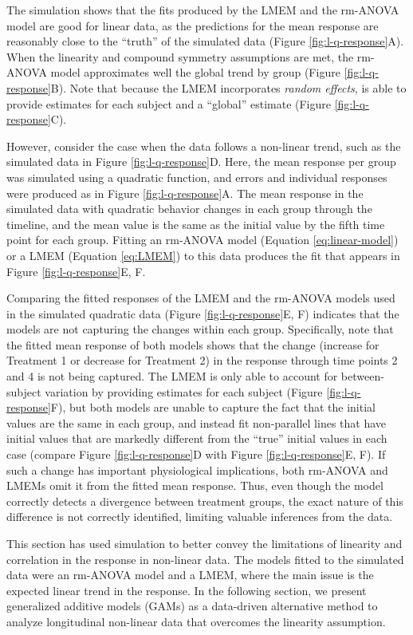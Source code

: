 \documentclass[
]{article}
\begin{document}
The simulation shows that the fits produced by the LMEM and the rm-ANOVA model are good for linear data, as the predictions for the mean response are reasonably close to the ``truth'' of the simulated data (Figure \ref{fig:l-q-response}A). When the linearity and compound symmetry assumptions are met, the rm-ANOVA model approximates well the global trend by group (Figure \ref{fig:l-q-response}B). Note that because the LMEM incorporates \emph{random effects}, is able to provide estimates for each subject and a ``global'' estimate (Figure \ref{fig:l-q-response}C).

However, consider the case when the data follows a non-linear trend, such as the simulated data in Figure \ref{fig:l-q-response}D. Here, the mean response per group was simulated using a quadratic function, and errors and individual responses were produced as in Figure \ref{fig:l-q-response}A. The mean response in the simulated data with quadratic behavior changes in each group through the timeline, and the mean value is the same as the initial value by the fifth time point for each group. Fitting an rm-ANOVA model (Equation \eqref{eq:linear-model}) or a LMEM (Equation \eqref{eq:LMEM}) to this data produces the fit that appears in Figure \ref{fig:l-q-response}E, F.

Comparing the fitted responses of the LMEM and the rm-ANOVA models used in the simulated quadratic data (Figure \ref{fig:l-q-response}E, F) indicates that the models are not capturing the changes within each group. Specifically, note that the fitted mean response of both models shows that the change (increase for Treatment 1 or decrease for Treatment 2) in the response through time points 2 and 4 is not being captured. The LMEM is only able to account for between-subject variation by providing estimates for each subject (Figure \ref{fig:l-q-response}F), but both models are unable to capture the fact that the initial values are the same in each group, and instead fit non-parallel lines that have initial values that are markedly different from the ``true'' initial values in each case (compare Figure \ref{fig:l-q-response}D with Figure \ref{fig:l-q-response}E, F). If such a change has important physiological implications, both rm-ANOVA and LMEMs omit it from the fitted mean response. Thus, even though the model correctly detects a divergence between treatment groups, the exact nature of this difference is not correctly identified, limiting valuable inferences from the data.

This section has used simulation to better convey the limitations of linearity and correlation in the response in non-linear data. The models fitted to the simulated data were an rm-ANOVA model and a LMEM, where the main issue is the expected linear trend in the response. In the following section, we present generalized additive models (GAMs) as a data-driven alternative method to analyze longitudinal non-linear data that overcomes the linearity assumption.
\end{document}

